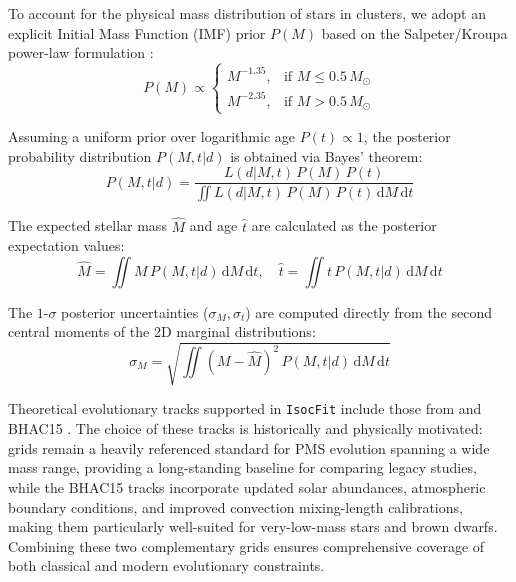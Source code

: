 \documentclass[preprints,article,submit,moreauthors,pdftex]{Definitions/mdpi}
\begin{document}
To account for the physical mass distribution of stars in clusters, we adopt an explicit Initial Mass Function (IMF) prior $P(M)$ based on the Salpeter/Kroupa power-law formulation \citep{salpeter1955luminosity, kroupa2001variation}:
\begin{equation}
    P(M) \propto \begin{cases}
        M^{-1.35}, & \text{if } M \le 0.5\,M_\odot \\
        M^{-2.35}, & \text{if } M > 0.5\,M_\odot
    \end{cases}
    \label{eq:imf}
\end{equation}

Assuming a uniform prior over logarithmic age $P(t) \propto 1$, the posterior probability distribution $P(M, t | d)$ is obtained via Bayes' theorem:
\begin{equation}
    P(M, t | d) = \frac{L(d | M, t) \, P(M) \, P(t)}{\iint L(d | M, t) \, P(M) \, P(t) \, \mathrm{d}M \, \mathrm{d}t}
    \label{eq:posterior}
\end{equation}

The expected stellar mass $\hat{M}$ and age $\hat{t}$ are calculated as the posterior expectation values:
\begin{equation}
    \hat{M} = \iint M \, P(M, t | d) \, \mathrm{d}M \, \mathrm{d}t, \quad \hat{t} = \iint t \, P(M, t | d) \, \mathrm{d}M \, \mathrm{d}t
    \label{eq:expectation}
\end{equation}

The $1\text{-}\sigma$ posterior uncertainties ($\sigma_M, \sigma_t$) are computed directly from the second central moments of the 2D marginal distributions:
\begin{equation}
    \sigma_M = \sqrt{ \iint (M - \hat{M})^2 \, P(M, t | d) \, \mathrm{d}M \, \mathrm{d}t }
    \label{eq:mass_unc}
\end{equation}

Theoretical evolutionary tracks supported in \texttt{IsocFit} include those from \citet{siess2000internet} and BHAC15 \citep{baraffe2015new}. The choice of these tracks is historically and physically motivated: \citet{siess2000internet} grids remain a heavily referenced standard for PMS evolution spanning a wide mass range, providing a long-standing baseline for comparing legacy studies, while the BHAC15 tracks incorporate updated solar abundances, atmospheric boundary conditions, and improved convection mixing-length calibrations, making them particularly well-suited for very-low-mass stars and brown dwarfs. Combining these two complementary grids ensures comprehensive coverage of both classical and modern evolutionary constraints.
\end{document}
